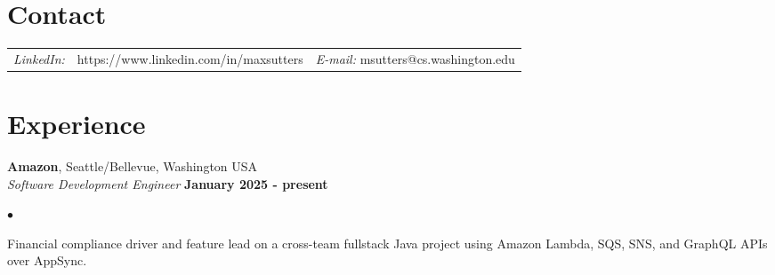 \documentclass[margin,line]{res}
\newenvironment{list2}{
  \begin{list}{$\bullet$}{%
      \setlength{\itemsep}{0in}
      \setlength{\parsep}{0in} \setlength{\parskip}{0in}
      \setlength{\topsep}{0in} \setlength{\partopsep}{0in} 
      \setlength{\leftmargin}{0.2in}}}{\end{list}}
\begin{document}
\thispagestyle{empty}


\begin{resume}
\section{\sc Contact} %
\vspace{.05in}
\begin{tabular}{@{}p{0.5in}p{2.5in}p{3in}}
{\it LinkedIn:} & https://www.linkedin.com/in/maxsutters & {\it E-mail:}  msutters@cs.washington.edu \\   
\end{tabular}

\section{\sc Experience}

{\bf Amazon}, Seattle/Bellevue, Washington USA \\
{\em Software Development Engineer} \hfill {\bf January 2025 - present} \\
% 
\begin{list2}
\item Financial compliance driver and feature lead on a cross-team fullstack Java project using Amazon Lambda, SQS, SNS, and GraphQL APIs over AppSync.
\end{list2}


\end{resume}
\end{document}
